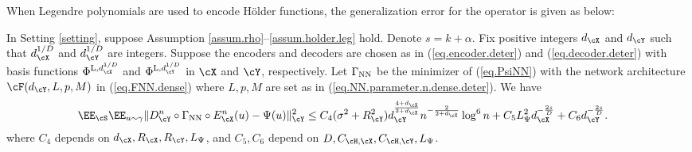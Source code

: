 \documentclass[11pt]{article} %
\begin{document}
When Legendre polynomials are used to encode H\"{o}lder functions, the generalization error for the operator is given as below: 
\begin{corollary}\label{coro.leg}
	In Setting \ref{setting},
	suppose Assumption \ref{assum.rho}--\ref{assum.holder.leg} hold. Denote $s=k+\alpha$.
Fix positive integers 	$d_{\cX}$ and $d_{\cY}$ such that $d_{\cX}^{1/D}$ and $d_{\cY}^{1/D}$ are integers. Suppose the encoders and decoders are chosen as in (\ref{eq.encoder.deter}) and (\ref{eq.decoder.deter}) with basis functions $\Phi^{{\rm L},d_{\cX}^{1/D}}$ and $\Phi^{{\rm L},d_{\cY}^{1/D}}$ in $\cX$ and $\cY$, respectively. 
	Let $\Gamma_{\rm NN}$ be the minimizer of (\ref{eq.PsiNN}) with the network architecture $\cF(d_{\cY},L,p,M)$ in (\ref{eq.FNN.dense}) where $L,p,M$ are set as in (\ref{eq.NN.parameter.n.dense.deter}). We have
	\begin{align*}
		&\EE_{\cS}\EE_{u\sim \gamma}\|D_{\cY}^n\circ \Gamma_{\rm NN} \circ E_{\cX}^n(u)- \Psi(u)\|_{\cY}^2 
		\leq C_{4}(\sigma^2+R_{\cY}^2)d_{\cY}^{\frac{4+d_{\cX}}{2+d_{\cX}}}n^{-\frac{2}{2+d_{\cX}}}\log^6 n + C_5L_{\Psi}^2d_{\cX}^{-\frac{2s}{D}}+C_6d_{\cY}^{-\frac{2s}{D}}.
	\end{align*}
	where $C_{4}$ depends on $d_{\cX},R_{\cX},R_{\cY},L_{\Psi}$, and $C_5,C_6$ depend on $D,C_{\cH,\cX},C_{\cH,\cY}, L_{\Psi}$.
\end{corollary}
\end{document}
